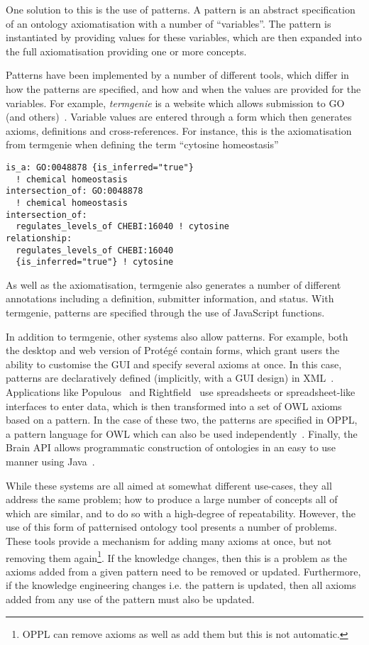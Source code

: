 \documentclass{icbo}
\newcommand{\protege}{Prot\'eg\'e\xspace}
\begin{document}
One solution to this is the use of patterns. A pattern is an abstract
specification of an ontology axiomatisation with a number of
``variables''. The pattern is instantiated by providing values for
these variables, which are then expanded into the full axiomatisation
providing one or more concepts.

Patterns have been implemented by a number of different tools, which
differ in how the patterns are specified, and how and when the values
are provided for the variables. For example, \textit{termgenie} is a
website which allows submission to GO (and
others)~\citep{Dietze_2014}. Variable values are entered through a
form which then generates axioms, definitions and
cross-references. For instance, this is the axiomatisation from
termgenie when defining the term ``cytosine homeostasis''

\begin{verbatim}
is_a: GO:0048878 {is_inferred="true"} 
  ! chemical homeostasis
intersection_of: GO:0048878
  ! chemical homeostasis
intersection_of: 
  regulates_levels_of CHEBI:16040 ! cytosine
relationship: 
  regulates_levels_of CHEBI:16040 
  {is_inferred="true"} ! cytosine 
\end{verbatim}

As well as the axiomatisation, termgenie also generates a number of
different annotations including a definition, submitter information,
and status. With termgenie, patterns are specified through the use of
JavaScript functions.

In addition to termgenie, other systems also allow patterns. For
example, both the desktop and web version of \protege contain forms,
which grant users the ability to customise the GUI and specify several
axioms at once. In this case, patterns are declaratively defined
(implicitly, with a GUI design) in
XML~\citep{tudorach_icd_webprotege}. Applications like
Populous~\citep{Jupp_Wolstencroft_Stevens_2011} and
Rightfield~\citep{rightfield} use spreadsheets or spreadsheet-like
interfaces to enter data, which is then transformed into a set of OWL
axioms based on a pattern. In the case of these two, the patterns are
specified in OPPL, a pattern language for OWL which can also be used
independently~\citep{aranguren_Stevens_Antezana_2009}. Finally, the
Brain API allows programmatic construction of ontologies in an easy to
use manner using Java~\citep{croset2013}.

While these systems are all aimed at somewhat different use-cases,
they all address the same problem; how to produce a large number of
concepts all of which are similar, and to do so with a high-degree of
repeatability. However, the use of this form of patternised ontology
tool presents a number of problems. These tools provide a mechanism
for adding many axioms at once, but not removing them
again\footnote{OPPL can remove axioms as well as add them but this is
  not automatic.}. If the knowledge changes, then this is a problem as
the axioms added from a given pattern need to be removed or
updated. Furthermore, if the knowledge engineering changes i.e. the
pattern is updated, then all axioms added from any use of the pattern
must also be updated.
\end{document}
